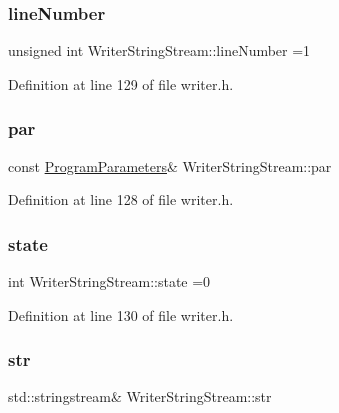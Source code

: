 \subsubsection{\texorpdfstring{line\+Number}{lineNumber}}
{\footnotesize\ttfamily unsigned int Writer\+String\+Stream\+::line\+Number =1\hspace{0.3cm}{\ttfamily [private]}}



Definition at line 129 of file writer.\+h.

\mbox{\label{classWriterStringStream_a277f75abd6a10bb97d293a2913cd4534}} 
\subsubsection{\texorpdfstring{par}{par}}
{\footnotesize\ttfamily const \hyperlink{structProgramParameters}{Program\+Parameters}\& Writer\+String\+Stream\+::par\hspace{0.3cm}{\ttfamily [private]}}



Definition at line 128 of file writer.\+h.

\mbox{\label{classWriterStringStream_aba2441895640b9fe440d82c0bc678cdf}} 
\subsubsection{\texorpdfstring{state}{state}}
{\footnotesize\ttfamily int Writer\+String\+Stream\+::state =0\hspace{0.3cm}{\ttfamily [private]}}



Definition at line 130 of file writer.\+h.

\mbox{\label{classWriterStringStream_a9be1a39ca3e7936fa6e5ed8883a71f77}} 
\subsubsection{\texorpdfstring{str}{str}}
{\footnotesize\ttfamily std\+::stringstream\& Writer\+String\+Stream\+::str\hspace{0.3cm}{\ttfamily [private]}}



